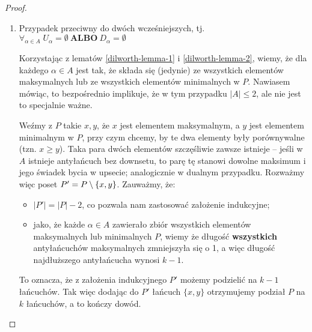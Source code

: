 \begin{proof}
\begin{enumerate}
		\item Przypadek przeciwny do dwóch wcześniejszych, tj. \(\forall_{\alpha \in A } \; U_{\alpha} = \emptyset \ \mathbf{ALBO}\ D_{\alpha} = \emptyset\)

		      Korzystając z lematów \ref{dilworth-lemma-1} i \ref{dilworth-lemma-2}, wiemy, że dla każdego \(\alpha \in A\) jest tak, że składa się (jedynie) ze wszystkich elementów maksymalnych lub ze wszystkich elementów minimalnych w \(P\). Nawiasem mówiąc, to bezpośrednio implikuje, że w tym przypadku \( |A| \leq 2 \), ale nie jest to specjalnie ważne.

		      Weźmy z \(P\) takie \(x, y\), że \(x\) jest elementem maksymalnym, a \(y\) jest elementem minimalnym w \(P\), przy czym chcemy, by te dwa elementy były porównywalne (tzn. \( x \geq y\)). Taka para dwóch elementów szczęśliwie zawsze istnieje -- jeśli w \(A\) istnieje antyłańcuch bez downsetu, to parę tę stanowi dowolne maksimum i jego świadek bycia w upsecie; analogicznie w dualnym przypadku.  Rozważmy więc poset \(P' = P \setminus \set{x,y} \). Zauważmy, że:
		      \begin{itemize}
			      \item \( |P'| = |P| - 2\), co pozwala nam zastosować założenie indukcyjne;
			      \item jako, że każde \( \alpha \in A\) zawierało zbiór wszystkich elementów maksymalnych lub minimalnych \(P\), wiemy że długość \textbf{wszystkich} antyłańcuchów maksymalnych zmniejszyła się o 1, a więc długość najdłuższego antyłańcucha wynosi \(k-1\).
		      \end{itemize}
		      To oznacza, że z założenia indukcyjnego \( P' \) możemy podzielić na \(k-1\) łańcuchów. Tak więc dodając do \(P'\) łańcuch \( \{x, y\} \) otrzymujemy podział \(P\) na \(k\) łańcuchów, a to kończy dowód.

	\end{enumerate}
\end{proof} %
